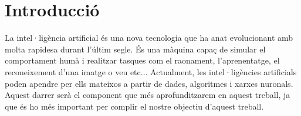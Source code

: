 \chapter{Introducció}
\label{c:intro}

La intel·ligència artificial és una nova tecnologia que ha anat evolucionant amb molta rapidesa durant l'últim segle. És una màquina capaç de simular el comportament humà i realitzar tasques com el raonament, l'aprenentatge, el reconeixement d'una imatge o veu etc... Actualment, les intel·ligències artificials poden apendre per ells mateixos a partir de dades, algoritmes i xarxes nuronals. Aquest darrer serà el component que més aprofunditzarem en aquest treball, ja que és ho més important per complir el nostre objectiu d'aquest treball.
